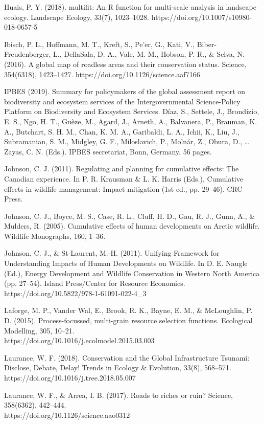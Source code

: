 \documentclass[titlepage]{article}
\begin{document}
Huais, P. Y. (2018). multifit: An R function for multi-scale analysis in landscape ecology. Landscape Ecology, 33(7), 1023–1028. https://doi.org/10.1007/s10980-018-0657-5

Ibisch, P. L., Hoffmann, M. T., Kreft, S., Pe’er, G., Kati, V., Biber-Freudenberger, L., DellaSala, D. A., Vale, M. M., Hobson, P. R., & Selva, N. (2016). A global map of roadless areas and their conservation status. Science, 354(6318), 1423–1427. https://doi.org/10.1126/science.aaf7166

IPBES (2019). Summary for policymakers of the global assessment report on biodiversity and ecosystem services of the Intergovernmental Science-Policy Platform on Biodiversity and Ecosystem Services. Díaz, S., Settele, J., Brondízio, E. S., Ngo, H. T., Guèze, M., Agard, J., Arneth, A., Balvanera, P., Brauman, K. A., Butchart, S. H. M., Chan, K. M. A., Garibaldi, L. A., Ichii, K., Liu, J., Subramanian, S. M., Midgley, G. F., Miloslavich, P., Molnár, Z., Obura, D., … Zayas, C. N. (Eds.). IPBES secretariat,  Bonn, Germany. 56 pages.

Johnson, C. J. (2011). Regulating and planning for cumulative effects: The Canadian experience. In P. R. Krausman & L. K. Harris (Eds.), Cumulative effects in wildlife management: Impact mitigation (1st ed., pp. 29–46). CRC Press.

Johnson, C. J., Boyce, M. S., Case, R. L., Cluff, H. D., Gau, R. J., Gunn, A., & Mulders, R. (2005). Cumulative effects of human developments on Arctic wildlife. Wildlife Monographs, 160, 1–36.

Johnson, C. J., & St-Laurent, M.-H. (2011). Unifying Framework for Understanding Impacts of Human Developments on Wildlife. In D. E. Naugle (Ed.), Energy Development and Wildlife Conservation in Western North America (pp. 27–54). Island Press/Center for Resource Economics.\\ https://doi.org/10.5822/978-1-61091-022-4_3

Laforge, M. P., Vander Wal, E., Brook, R. K., Bayne, E. M., & McLoughlin, P. D. (2015). Process-focussed, multi-grain resource selection functions. Ecological Modelling, 305, 10–21.\\ https://doi.org/10.1016/j.ecolmodel.2015.03.003

Laurance, W. F. (2018). Conservation and the Global Infrastructure Tsunami: Disclose, Debate, Delay! Trends in Ecology & Evolution, 33(8), 568–571. https://doi.org/10.1016/j.tree.2018.05.007

Laurance, W. F., & Arrea, I. B. (2017). Roads to riches or ruin? Science, 358(6362), 442–444. \\
https://doi.org/10.1126/science.aao0312
\end{document}
